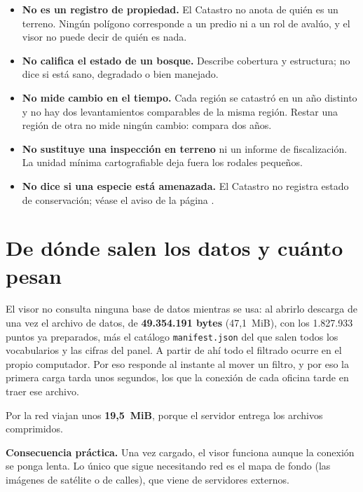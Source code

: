 \documentclass[11pt,a4paper]{report}
\newcommand{\campo}[1]{\textcolor{conaf}{\textbf{#1}}}
\newcommand{\orig}[1]{\texttt{\small #1}}
\begin{document}
\begin{alerta}
\begin{itemize}[leftmargin=*]
  \item \campo{No es un registro de propiedad.} El Catastro no anota de quién es
        un terreno. Ningún polígono corresponde a un predio ni a un rol de
        avalúo, y el visor no puede decir de quién es nada.
  \item \campo{No califica el estado de un bosque.} Describe cobertura y
        estructura; no dice si está sano, degradado o bien manejado.
  \item \campo{No mide cambio en el tiempo.} Cada región se catastró en un año
        distinto y no hay dos levantamientos comparables de la misma región.
        Restar una región de otra no mide ningún cambio: compara dos años.
  \item \campo{No sustituye una inspección en terreno} ni un informe de
        fiscalización. La unidad mínima cartografiable deja fuera los rodales
        pequeños.
  \item \campo{No dice si una especie está amenazada.} El Catastro no registra
        estado de conservación; véase el aviso de la página
        \pageref{sec:conservacion}.
\end{itemize}
\end{alerta}

\section{De dónde salen los datos y cuánto pesan}

El visor no consulta ninguna base de datos mientras se usa: al abrirlo descarga
de una vez el archivo de datos, de \textbf{49.354.191 bytes} (47,1~MiB), con los
1.827.933 puntos ya preparados, más el catálogo \orig{manifest.json} del que
salen todos los vocabularios y las cifras del panel. A partir de ahí todo el
filtrado ocurre en el
propio computador. Por eso responde al instante al mover un filtro, y por eso la
primera carga tarda unos segundos, los que la conexión de cada oficina tarde en
traer ese archivo.

Por la red viajan unos \textbf{19,5~MiB}, porque el servidor entrega los
archivos comprimidos.

\begin{nota}
\campo{Consecuencia práctica.} Una vez cargado, el visor funciona aunque la
conexión se ponga lenta. Lo único que sigue necesitando red es el mapa de fondo
(las imágenes de satélite o de calles), que viene de servidores externos.
\end{nota}
\end{document}
